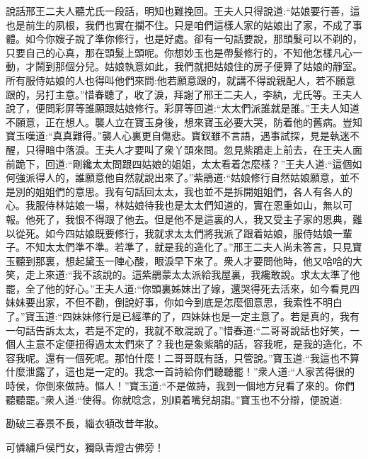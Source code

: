 


\begin{parag}
    說話邢王二夫人聽尤氏一段話，明知也難挽回。王夫人只得說道:“姑娘要行善，這也是前生的夙根，我們也實在攔不住。只是咱們這樣人家的姑娘出了家，不成了事體。如今你嫂子說了準你修行，也是好處。卻有一句話要說，那頭髮可以不剃的，只要自己的心真，那在頭髮上頭呢。你想妙玉也是帶髮修行的，不知他怎樣凡心一動，才鬧到那個分兒。姑娘執意如此，我們就把姑娘住的房子便算了姑娘的靜室。所有服侍姑娘的人也得叫他們來問:他若願意跟的，就講不得說親配人，若不願意跟的，另打主意。”惜春聽了，收了淚，拜謝了邢王二夫人，李紈，尤氏等。王夫人說了，便問彩屏等誰願跟姑娘修行。彩屏等回道:“太太們派誰就是誰。”王夫人知道不願意，正在想人。襲人立在寶玉身後，想來寶玉必要大哭，防着他的舊病。豈知寶玉嘆道:“真真難得。”襲人心裏更自傷悲。寶釵雖不言語，遇事試探，見是執迷不醒，只得暗中落淚。王夫人才要叫了衆丫頭來問。忽見紫鵑走上前去，在王夫人面前跪下，回道:“剛纔太太問跟四姑娘的姐姐，太太看着怎麼樣？”王夫人道:“這個如何強派得人的，誰願意他自然就說出來了。”紫鵑道:“姑娘修行自然姑娘願意，並不是別的姐姐們的意思。我有句話回太太，我也並不是拆開姐姐們，各人有各人的心。我服侍林姑娘一場，林姑娘待我也是太太們知道的，實在恩重如山，無以可報。他死了，我恨不得跟了他去。但是他不是這裏的人，我又受主子家的恩典，難以從死。如今四姑娘既要修行，我就求太太們將我派了跟着姑娘，服侍姑娘一輩子。不知太太們準不準。若準了，就是我的造化了。”邢王二夫人尚未答言，只見寶玉聽到那裏，想起黛玉一陣心酸，眼淚早下來了。衆人才要問他時，他又哈哈的大笑，走上來道:“我不該說的。這紫鵑蒙太太派給我屋裏，我纔敢說。求太太準了他罷，全了他的好心。”王夫人道:“你頭裏姊妹出了嫁，還哭得死去活來，如今看見四妹妹要出家，不但不勸，倒說好事，你如今到底是怎麼個意思，我索性不明白了。”寶玉道:“四妹妹修行是已經準的了，四妹妹也是一定主意了。若是真的，我有一句話告訴太太，若是不定的，我就不敢混說了。”惜春道:“二哥哥說話也好笑，一個人主意不定便扭得過太太們來了？我也是象紫鵑的話，容我呢，是我的造化，不容我呢。還有一個死呢。那怕什麼！二哥哥既有話，只管說。”寶玉道:“我這也不算什麼泄露了，這也是一定的。我念一首詩給你們聽聽罷！”衆人道:“人家苦得很的時侯，你倒來做詩。慪人！”寶玉道:“不是做詩，我到一個地方兒看了來的。你們聽聽罷。”衆人道:“使得。你就唸念，別順着嘴兒胡謅。”寶玉也不分辯，便說道:
\end{parag}


\begin{poem}

    \begin{pl}
        勘破三春景不長，緇衣頓改昔年妝。
    \end{pl}


    \begin{pl}
        可憐繡戶侯門女，獨臥青燈古佛旁！
    \end{pl}

\end{poem}


